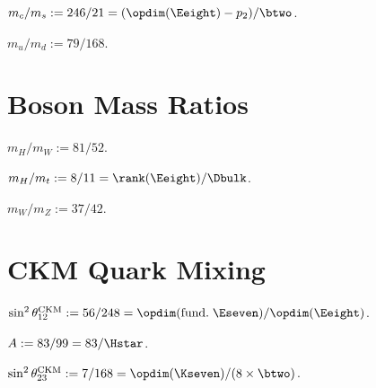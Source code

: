 \begin{definition}[$m_c/m_s$]\label{def:mc_ms}
    \leanok
    $m_c / m_s := 246/21 = (\opdim(\Eeight) - p_2) / \btwo$.
\end{definition}

\begin{definition}[$m_u/m_d$]\label{def:mu_md}
    \leanok
    $m_u / m_d := 79/168$.
\end{definition}

\section{Boson Mass Ratios}

\begin{definition}[$m_H/m_W$]\label{def:mH_mW}
    \leanok
    $m_H / m_W := 81/52$.
\end{definition}

\begin{definition}[$m_H/m_t$]\label{def:mH_mt}
    \leanok
    $m_H / m_t := 8/11 = \rank(\Eeight) / \Dbulk$.
\end{definition}

\begin{definition}[$m_W/m_Z$]\label{def:mW_mZ}
    \leanok
    $m_W / m_Z := 37/42$.
\end{definition}

\section{CKM Quark Mixing}

\begin{definition}\label{def:cabibbo}
    \leanok
    $\sin^2\theta_{12}^{\mathrm{CKM}} := 56/248 = \opdim(\mathrm{fund.}\; \Eseven) / \opdim(\Eeight)$.
\end{definition}

\begin{definition}[Wolfenstein $A$]\label{def:A_wolf}
    \leanok
    $A := 83/99 = 83/\Hstar$.
\end{definition}

\begin{definition}\label{def:theta23_ckm}
    \leanok
    $\sin^2\theta_{23}^{\mathrm{CKM}} := 7/168 = \opdim(\Kseven) / (8 \times \btwo)$.
\end{definition}

